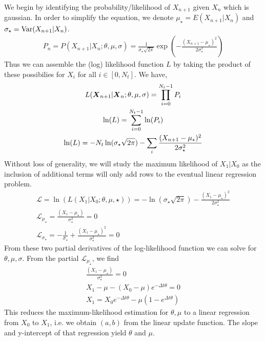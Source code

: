 \documentclass{article}
\begin{document}
\begin{enumerate}
        We begin by identifying the probability/likelihood of $X_{n+1}$ given
        $X_{n}$ which is gaussian. In order to simplify the equation, we denote $\mu_{\star} =
        E(X_{n+1} | X_n)$ and $\sigma_{\star} = \text{Var}(X_{n+1} | X_n)$.
        \begin{gather*}
            P_n = P(X_{n+1} | X_{n}; \theta, \mu, \sigma) =
            \frac{1}{\sigma_{\star}\sqrt{2\pi}}\exp\left(-\frac{(X_{n+1} -
            \mu_{\star})^2}{2\sigma_{\star}^2}\right)
        \end{gather*}
        Thus we can assemble the (log) likelihood function $L$ by taking the product
        of these possibilies for $X_i$ for all $i \in [0, N_t]$. We have, 
        \begin{gather*}
            L(\boldsymbol{X}_{n+1} | \boldsymbol{X}_{n}; \theta, \mu, \sigma) =
            \prod_{i=0}^{N_t-1}P_i
            \\
            \ln(L) = \sum_{i=0}^{N_t -1} \ln(P_i)
            \\
            \ln(L) = -N_t\ln(\sigma_{\star}\sqrt{2\pi}) - \sum_{i}
            \frac{(X_{n+1} - 
            \mu_{\star})^2}{2\sigma_{\star}^2}
        \end{gather*}
        Without loss of generality, we will study the maximum likelihood of
        $X_1|X_0$ as the inclusion of additional terms will only add rows to the
        eventual linear regression problem. 
        \begin{gather*}
            \mathcal{L} = \ln(L(X_1|X_0;\theta, \mu, \star)) = 
            -\ln(\sigma_{\star}\sqrt{2\pi}) - 
            \frac{(X_{1} - 
            \mu_{\star})^2}{2\sigma_{\star}^2}
            \\
            \mathcal{L}_{\mu_{\star}} = \frac{(X_1 -
            \mu_{\star})}{\sigma_{\star}^2} = 0 
            \\
            \mathcal{L}_{\sigma_{\star}} = -\frac{1}{\sigma_{\star}} +
            \frac{(X_1 - \mu_{\star})^2}{\sigma_{\star}^3} = 0 
        \end{gather*}
        From these two partial derivatives of the log-likelihood function we
        can solve for $\theta, \mu, \sigma$. From the partial
        $\mathcal{L}_{\mu_{\star}}$, we find
        \begin{gather*}
            \frac{(X_1 -
            \mu_{\star})}{\sigma_{\star}^2} = 0
            \\
            X_1 - \mu - (X_0 - \mu) e^{-\Delta t \theta} = 0
            \\
            X_1 = X_0e^{-\Delta t \theta} - \mu(1 - e^{\Delta t \theta})
        \end{gather*}
        This reduces the maximum-likelihood estimation for $\theta, \mu$ to a
        linear regression from $X_0$ to $X_1$, i.e. we obtain $(a,b)$ from the
        linear update function. The slope and y-intercept of that regression
        yield $\theta$ and $\mu$. 


\end{enumerate}
\end{document}
